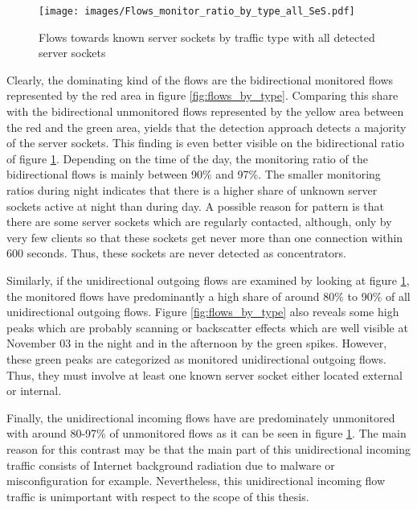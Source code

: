 \begin{figure}[h]
	\centering
	\texttt{[image: images/Flows\_monitor\_ratio\_by\_type\_all\_SeS.pdf]}
	\caption{Flows towards known server sockets by traffic type with all detected server sockets}
	\label{fig:monitored_flows_by_type}
\end{figure}

Clearly, the dominating kind of the flows are the bidirectional monitored flows represented by the red area in figure \ref{fig:flows_by_type}. 
Comparing this share with the bidirectional unmonitored flows represented by the yellow area between the red and the green area, yields that the detection approach detects a majority of the \glspl{server socket}.
This finding is even better visible on the bidirectional ratio of figure \ref{fig:monitored_flows_by_type}.
Depending on the time of the day, the monitoring ratio of the bidirectional flows is mainly between 90\% and 97\%.
The smaller monitoring ratios during night indicates that there is a higher share of unknown \glspl{server socket} active at night than during day.
A possible reason for pattern is that there are some \glspl{server socket} which are regularly contacted, although, only by very few clients so that these sockets get never more than one connection within 600 seconds. 
Thus, these sockets are never detected as concentrators.

Similarly, if the unidirectional outgoing flows are examined by looking at figure \ref{fig:monitored_flows_by_type}, the monitored flows have predominantly a high share of around 80\% to 90\% of all unidirectional outgoing flows. 
Figure \ref{fig:flows_by_type} also reveals some high peaks which are probably scanning or backscatter effects which are well visible at November 03 in the night and in the afternoon by the green spikes. 
However, these green peaks are categorized as monitored unidirectional outgoing flows. 
Thus, they must involve at least one known \gls{server socket} either located external or internal.

Finally, the unidirectional incoming flows have are predominately unmonitored with around 80-97\% of unmonitored flows as it can be seen in figure \ref{fig:monitored_flows_by_type}. 
The main reason for this contrast may be that the main part of this unidirectional incoming traffic consists of Internet background radiation \citep{Wustrow10,Pang04} due to malware or misconfiguration for example. 
Nevertheless, this unidirectional incoming flow traffic is unimportant with respect to the scope of this thesis.

